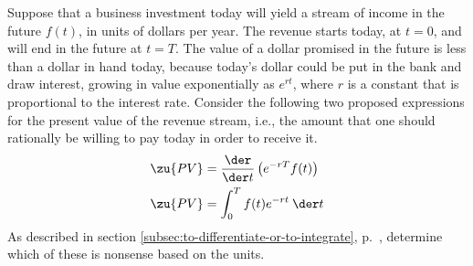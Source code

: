 Suppose that a business investment today will yield a stream of income
in the future $f(t)$, in units of dollars per year. The revenue starts today, at $t=0$,
and will end in the future at $t=T$.
The value of a dollar promised
in the future is less than a dollar in hand today, because today's dollar could
be put in the bank and draw interest, growing in value exponentially as $e^{rt}$, where $r$ is a constant
that is proportional to the interest rate. 
Consider the following two proposed expressions for the present value of the revenue
stream, i.e., the amount that one should rationally be willing to pay today in order to receive it.
\begin{align*}
  \zu{PV} &= \frac{\der}{\der t} \left(e^{-rT}f(t)\right) \\
  \zu{PV} &= \int_0^T f(t)e^{-rt}\:\der t
\end{align*}
As described in
section \ref{subsec:to-differentiate-or-to-integrate}, p.~\pageref{subsec:to-differentiate-or-to-integrate},
determine which of these is nonsense based on the units.
